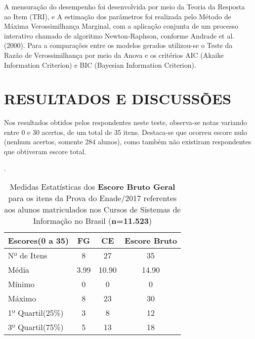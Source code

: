 \documentclass[12pt]{article}
\begin{document}
A mensuração do desempenho foi desenvolvida por meio da Teoria da Resposta ao Item (TRI), e A estimação dos parâmetros foi realizada pelo Método de Máxima Verossimilhança Marginal, com a aplicação conjunta de um processo interativo chamado de algoritmo Newton-Raphson, conforme Andrade et al. (2000). Para a comparações entre os modelos gerados utilizou-se o Teste da Razão de Verossimilhança por meio da Anova e os critérios AIC (Akaike Information Criterion) e BIC (Bayesian Information Criterion).

\newpage
\section{RESULTADOS E DISCUSSÕES}
  
Nos resultados obtidos pelos respondentes neste teste, observa-se notas variando entre 0 e 30 acertos, de um total de 35 itens. Destaca-se que ocorreu escore nulo (nenhum acertos, somente 284 alunos), como também não existiram respondentes que obtiveram escore total.  


\begin{table}[htb]
	\centering
	\caption{Medidas Estatísticas dos \textbf{Escore Bruto Geral} para os itens da Prova do Enade/2017 referentes aos alunos matriculados nos Cursos de Sistemas de Informação no Brasil (\textbf{n=11.523})}.
\begin{tabular}{l|c|c|c}
\hline\hline 
 Escores(0 a 35)  & FG      &  CE     & Escore Bruto   \\
\hline\hline
 Nº de Itens      & 8       &  27     &   35           \\
 Média            &  3.99   &  10.90  &   14.90        \\
 Mínimo           &  0      &  0      &   0            \\
 Máximo           &  8      &  23     &  30            \\
 1º Quartil(25\%) &  3      &  8      &   12           \\
 3º Quartil(75\%) &  5      &  13     &   18           \\
\hline\hline
\end{tabular}
\end{table}
\end{document}
